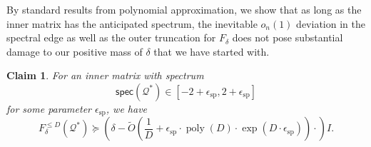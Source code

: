 \documentclass[12pt]{article}
\def \eps {\epsilon}
\newtheorem{claim}[theorem]{Claim}
\newcommand{\poly}{\operatorname{poly}}
\newcommand{\calQ}{\mathcal{Q}}
\newcommand{\gam}{\gamma}
\begin{document}
By standard results from polynomial approximation, we show that as long as the inner matrix has the anticipated spectrum, the inevitable $o_n(1)$ deviation in the spectral edge as well as the outer truncation for $F_\delta$ does not pose substantial damage to our positive mass of $\delta$ that we have started with.


\begin{claim}\label{clm: outer-truncation}
   For an inner matrix with spectrum  \[ 
 \mathsf{spec}(\calQ^*) \in [-2+ \eps_{\mathrm{sp}} , 2+ \eps_{\mathrm{sp}}  ]
 \]
 for some parameter $\eps_{\mathrm{sp}}$, we have
 	\[ 
 	F_{\delta}^{\leq D}(\calQ^*) \succeq \left( \delta - \tilde{O}\!\left(\frac{1}{D} + \eps_{\mathrm{sp}} \cdot \poly(D)\cdot \exp(D\cdot  \eps_{\mathrm{sp}})\right)\cdot  \right) I.
 	\]
\end{claim}
 
\end{document}
